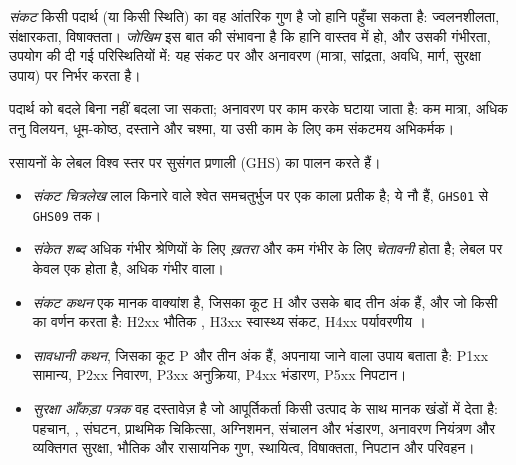 \begin{definition}[संकट और जोखिम]\label{def:b1:lab-techniques-1:hazard}
\emph{संकट} किसी पदार्थ (या
किसी स्थिति) का वह आंतरिक गुण है जो हानि पहुँचा सकता है: ज्वलनशीलता, संक्षारकता,
विषाक्तता। \emph{जोखिम} इस बात की संभावना है कि हानि वास्तव में
हो, और उसकी गंभीरता, उपयोग की दी गई परिस्थितियों में: यह
संकट पर और अनावरण (मात्रा, सांद्रता, अवधि, मार्ग,
सुरक्षा उपाय) पर निर्भर करता है।
\end{definition}

पदार्थ को बदले बिना  नहीं बदला जा सकता; 
अनावरण पर काम करके घटाया जाता है: कम मात्रा, अधिक तनु
विलयन, धूम-कोष्ठ, दस्ताने और चश्मा, या उसी काम के लिए कम संकटमय अभिकर्मक।

\begin{definition}\label{def:b1:lab-techniques-1:ghs}
रसायनों के लेबल विश्व स्तर पर सुसंगत प्रणाली (GHS) का पालन करते हैं।
\begin{itemize}
  \item \emph{संकट चित्रलेख} लाल किनारे वाले
        श्वेत समचतुर्भुज पर एक काला प्रतीक है; ये नौ हैं, \texttt{GHS01}
        से \texttt{GHS09} तक।
  \item \emph{संकेत शब्द} अधिक गंभीर  श्रेणियों के लिए
        \emph{ख़तरा} और कम गंभीर के लिए \emph{चेतावनी} होता है; लेबल पर
        केवल एक होता है, अधिक गंभीर वाला।
  \item \emph{संकट कथन} एक मानक
        वाक्यांश है, जिसका कूट H और उसके बाद तीन अंक हैं, और जो किसी  का वर्णन करता है:
        H2xx भौतिक , H3xx स्वास्थ्य संकट, H4xx पर्यावरणीय
        ।
  \item \emph{सावधानी कथन},
        जिसका कूट P और तीन अंक हैं, अपनाया जाने वाला उपाय बताता है: P1xx सामान्य,
        P2xx निवारण, P3xx अनुक्रिया, P4xx भंडारण, P5xx निपटान।
  \item \emph{सुरक्षा आँकड़ा पत्रक} वह
        दस्तावेज़ है जो आपूर्तिकर्ता किसी उत्पाद के साथ मानक
        खंडों में देता है: पहचान, , संघटन, प्राथमिक चिकित्सा,
        अग्निशमन, संचालन और भंडारण, अनावरण नियंत्रण और
        व्यक्तिगत सुरक्षा, भौतिक और रासायनिक गुण, स्थायित्व, विषाक्तता,
        निपटान और परिवहन।
\end{itemize}
\end{definition}

